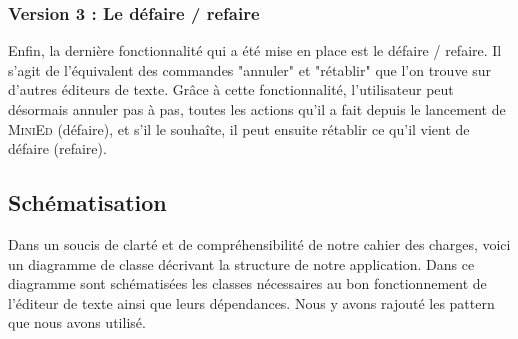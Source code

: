 \documentclass[a4paper]{article}
\begin{document}
			\subsubsection{Version 3 : Le défaire / refaire}

			Enfin, la dernière fonctionnalité qui a été mise en place est le défaire / refaire. Il s'agit de l'équivalent des commandes "annuler" et "rétablir" que l'on trouve sur d'autres éditeurs de texte. Grâce à cette fonctionnalité, l'utilisateur peut désormais annuler pas à pas, toutes les actions qu'il a fait depuis le lancement de \textsc{MiniEd} (défaire), et s'il le souhaîte, il peut ensuite rétablir ce qu'il vient de défaire (refaire).

			\vspace{0.5cm}

		\subsection{Schématisation}

		\vspace{0.5cm}

		Dans un soucis de clarté et de compréhensibilité de notre cahier des charges, voici un diagramme de classe décrivant la structure de notre application. Dans ce diagramme sont schématisées les classes nécessaires au bon fonctionnement de l’éditeur de texte ainsi que leurs dépendances. Nous y avons rajouté les pattern que nous avons utilisé.
\end{document}
